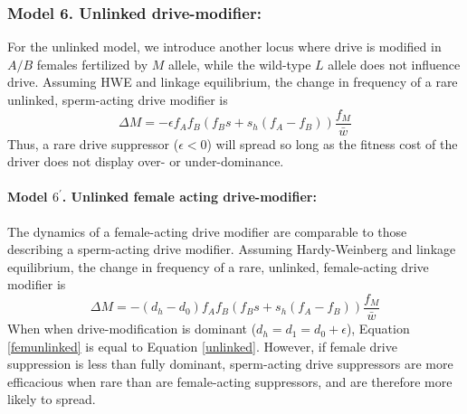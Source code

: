 \documentclass[12pt,letterpaper]{article}
\begin{document}
\subsubsection*{Model 6. Unlinked drive-modifier:}
For the unlinked model, we introduce another locus where drive is modified in $A/B$ females fertilized by $M$ allele, 
	while the wild-type $L$ allele does not influence drive. 
Assuming HWE and linkage equilibrium, the change in frequency of a rare unlinked, sperm-acting drive modifier is 
\begin{equation} \Delta M =-\epsilon f_A f_B (f_B s + s_h (f_A - f_B) ) \frac{f_M}{\bar{w}}  \label{unlinked} \end{equation}
Thus, a rare drive suppressor ($\epsilon<0$) will spread so long as the fitness cost of the driver does not display over- or under-dominance. 

\paragraph{Model $6^\prime$. Unlinked female acting drive-modifier:}
The dynamics of a female-acting drive modifier are comparable to those describing a sperm-acting drive modifier.  
Assuming Hardy-Weinberg and linkage equilibrium, the change in frequency of a rare, unlinked, female-acting drive modifier is 
\begin{equation} \Delta M =-(d_h-d_0) f_A f_B (f_B s + s_h (f_A - f_B) ) \frac{f_M}{\bar{w}}  \label{femunlinked} \end{equation}
When  when drive-modification is dominant ($d_h = d_1 = d_0 + \epsilon$), Equation \ref{femunlinked} is equal to Equation \ref{unlinked}.
 However, if female drive suppression is less than fully dominant, sperm-acting drive suppressors are more efficacious when rare than are female-acting suppressors, and are therefore more likely to spread.  





\newpage
\end{document}
